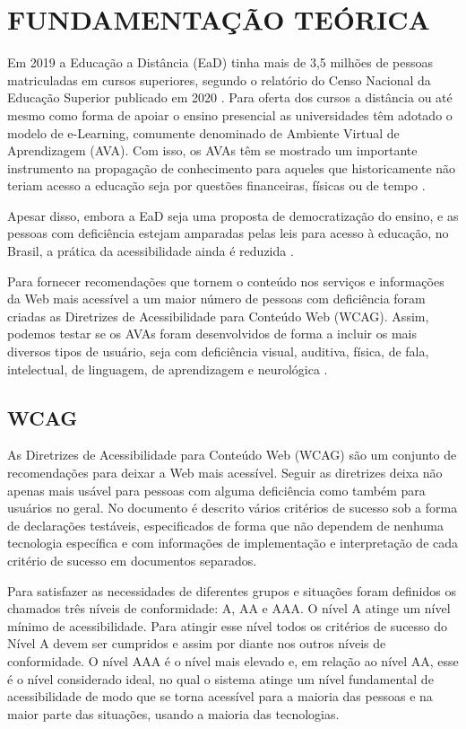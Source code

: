 \documentclass[
	12pt,				%
	openright,			%
	oneside,			%
	a4paper,			%
	chapter=TITLE,		%
	section=TITLE,		%
	subsection=TITLE,	%
	subsubsection=TITLE,%
	english,			%
	brazil				%
	]{abntex2}
\theoremstyle{definition}
\begin{document}
\chapter{FUNDAMENTAÇÃO TEÓRICA}

Em 2019 a Educação a Distância (EaD) tinha mais de 3,5 milhões de pessoas matriculadas em cursos superiores, segundo o relatório do Censo Nacional da Educação Superior publicado em 2020 \cite{da2019notas}. Para oferta dos cursos a distância ou até mesmo como forma de apoiar o ensino presencial as universidades têm adotado o modelo de e-Learning, comumente denominado de Ambiente Virtual de Aprendizagem (AVA). Com isso, os AVAs têm se mostrado um importante instrumento na propagação de conhecimento para aqueles que historicamente não teriam acesso a educação seja por questões financeiras, físicas ou de tempo \cite{sharma2014quantitative}.

Apesar disso, embora a EaD seja uma proposta de democratização do ensino, e as pessoas com deficiência estejam amparadas pelas leis para acesso à educação, no Brasil, a prática da acessibilidade ainda é reduzida \cite{dos2021acessibilidade}.

Para fornecer recomendações que tornem o conteúdo nos serviços e informações da Web mais acessível a um maior número de pessoas com deficiência foram criadas as Diretrizes de Acessibilidade para Conteúdo Web (WCAG). Assim, podemos testar se os AVAs foram desenvolvidos de forma a incluir os mais diversos tipos de usuário, seja com deficiência visual, auditiva, física, de fala, intelectual, de linguagem, de aprendizagem e neurológica \cite{caldwell2008web}.

\section{WCAG}
 
As Diretrizes de Acessibilidade para Conteúdo Web (WCAG) são um conjunto de recomendações para deixar a Web mais acessível. Seguir as diretrizes deixa não apenas mais usável para pessoas com alguma deficiência como também para usuários no geral. No documento é descrito vários critérios de sucesso sob a forma de declarações testáveis, especificados de forma que não dependem de nenhuma tecnologia específica e com informações de implementação e interpretação de cada critério de sucesso em documentos separados.

Para satisfazer as necessidades de diferentes grupos e situações foram definidos os chamados três níveis de conformidade: A, AA e AAA. O nível A atinge um nível mínimo de acessibilidade. Para atingir esse nível todos os critérios de sucesso do Nível A devem ser cumpridos e assim por diante nos outros níveis de conformidade. O nível AAA é o nível mais elevado e, em relação ao nível AA, esse é o nível considerado ideal, no qual o sistema atinge um nível fundamental de acessibilidade de modo que se torna acessível para a maioria das pessoas e na maior parte das situações, usando a maioria das tecnologias.
\end{document}
